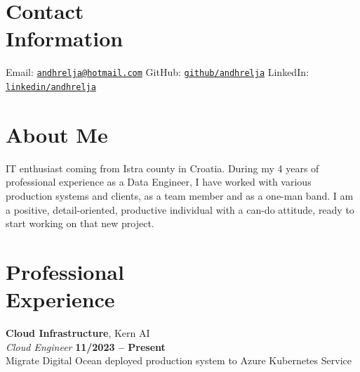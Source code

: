 \documentclass[margin,line]{resume}
\begin{document}
 
\begin{resume}

    \section{\mysidestyle Contact\\Information}

    Email: \href{mailto:andhrelja@hotmail.com}{\texttt{andhrelja@hotmail.com}} \hfill
    GitHub: \href{https://github.com/andhrelja}{\texttt{github/andhrelja}} \hfill
    LinkedIn: \href{https://www.linkedin.com/in/andhrelja/}{\texttt{linkedin/andhrelja}} \hfill

    \vspace{3mm}

    \section{\mysidestyle About Me}

    IT enthusiast coming from Istra county in Croatia. During my 4 years of professional experience as a Data Engineer, I have worked with various production systems and clients, as a team member and as a one-man band. I am a positive, detail-oriented, productive individual with a can-do attitude, ready to start working on that new project.

    \vspace{3mm}

    \section{\mysidestyle Professional\\Experience}

        \textbf{Cloud Infrastructure}, Kern AI \vspace{2mm}\\\vspace{1mm}%
    \textsl{Cloud Engineer} \hfill \textbf{11/2023 -- Present}\\
    Migrate Digital Ocean deployed production system to Azure Kubernetes Service


\end{resume}
\end{document}
